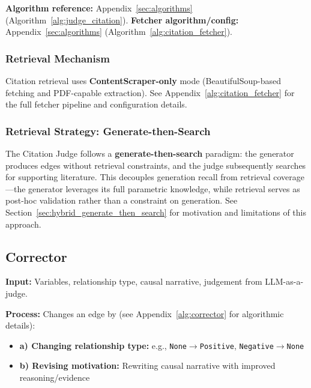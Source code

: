 \textbf{Algorithm reference:} Appendix~\ref{sec:algorithms} (Algorithm~\ref{alg:judge_citation}). \textbf{Fetcher algorithm/config:} Appendix~\ref{sec:algorithms} (Algorithm~\ref{alg:citation_fetcher}).

\subsubsection{Retrieval Mechanism}

Citation retrieval uses \textbf{ContentScraper-only} mode (BeautifulSoup-based fetching and PDF-capable extraction). See Appendix~\ref{alg:citation_fetcher} for the full fetcher pipeline and configuration details.

\subsubsection{Retrieval Strategy: Generate-then-Search}
\label{sec:retrieval_strategy}

The Citation Judge follows a \textbf{generate-then-search} paradigm: the generator produces edges without retrieval constraints, and the judge subsequently searches for supporting literature. This decouples generation recall from retrieval coverage---the generator leverages its full parametric knowledge, while retrieval serves as post-hoc validation rather than a constraint on generation. See Section~\ref{sec:hybrid_generate_then_search} for motivation and limitations of this approach.

\subsection{Corrector}
\label{sec:corrector}

\textbf{Input:} Variables, relationship type, causal narrative, judgement from LLM-as-a-judge.

\textbf{Process:} Changes an edge by (see Appendix~\ref{alg:corrector} for algorithmic details):
\begin{itemize}[noitemsep]
    \item \textbf{a) Changing relationship type:} e.g., \texttt{None}$\rightarrow$\texttt{Positive}, \texttt{Negative}$\rightarrow$\texttt{None}
    \item \textbf{b) Revising motivation:} Rewriting causal narrative with improved reasoning/evidence
\end{itemize}

